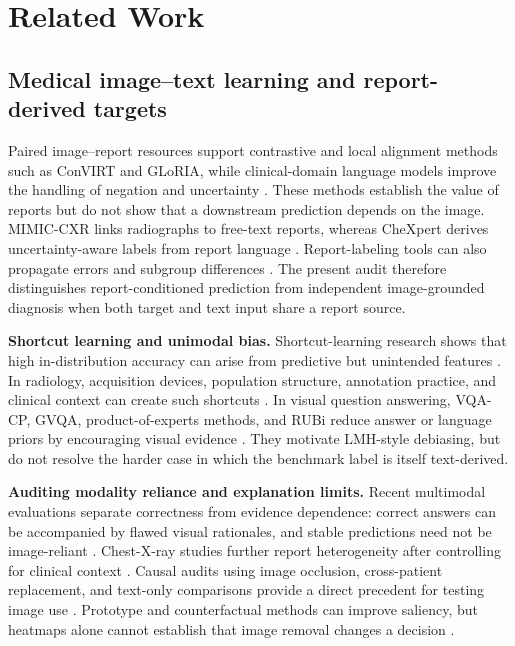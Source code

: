 
\section{Related Work}\label{sec:related-work}

\subsection{Medical image--text learning and report-derived targets}
Paired image--report resources support contrastive and local alignment methods
such as ConVIRT and GLoRIA, while clinical-domain language models improve the
handling of negation and uncertainty \citep{zhang2022convirt,huang2021gloria,boecking2022textsemantics}.
These methods establish the value of reports but do not show that a downstream
prediction depends on the image. MIMIC-CXR links radiographs to free-text
reports, whereas CheXpert derives uncertainty-aware labels from report language
\citep{johnson2019mimiccxr,irvin2019chexpert}. Report-labeling tools can also
propagate errors and subgroup differences \citep{sabottke2024targetselection,santomartino2024nlplabeling}.
The present audit therefore distinguishes report-conditioned prediction from
independent image-grounded diagnosis when both target and text input share a
report source.

\textbf{Shortcut learning and unimodal bias.}
Shortcut-learning research shows that high in-distribution accuracy can arise from
predictive but unintended features \citep{geirhos2020shortcut}. In radiology,
acquisition devices, population structure, annotation practice, and clinical
context can create such shortcuts \citep{gichoya2023shortcuts}. In visual
question answering, VQA-CP, GVQA, product-of-experts methods, and RUBi reduce
answer or language priors by encouraging visual evidence \citep{agrawal2018dontassume,clark2019easyway,cadene2019rubi}.
They motivate LMH-style debiasing, but do not resolve the harder case in which
the benchmark label is itself text-derived.

\textbf{Auditing modality reliance and explanation limits.}
Recent multimodal evaluations separate correctness from evidence dependence:
correct answers can be accompanied by flawed visual rationales, and stable
predictions need not be image-reliant \citep{jin2024hiddenflaws,sadanandan2026consistentdangerous}.
Chest-X-ray studies further report heterogeneity after controlling for clinical
context \citep{wang2026clinicalcontext}. Causal audits using image occlusion,
cross-patient replacement, and text-only comparisons provide a direct precedent
for testing image use \citep{lotfinia2026needimage}. Prototype and counterfactual
methods can improve saliency, but heatmaps alone cannot establish that image
removal changes a decision \citep{chiang2026cxrnexus}.

